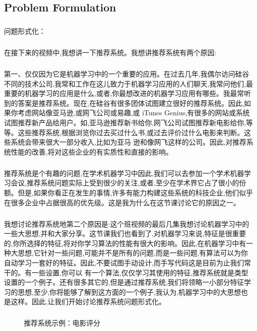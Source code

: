 \documentclass{article}
\begin{document}
\begin{CJK}{UTF8}{gbsn}
\subsection{Problem Formulation}
\subparagraph{}
问题形式化：
\subparagraph{}
在接下来的视频中,我想讲一下推荐系统。我想讲推荐系统有两个原因:
\subparagraph{}
第一、仅仅因为它是机器学习中的一个重要的应用。在过去几年,我偶尔访问硅谷不同的技术公司,我常和工作在这儿致力于机器学习应用的人们聊天,我常问他们,最重要的机器学习的应用是什么,或者,你最想改进的机器学习应用有哪些。我最常听到的答案是推荐系统。现在,在硅谷有很多团体试图建立很好的推荐系统。因此,如果你考虑网站像亚马逊,或网飞公司或易趣,或 iTunes Genius,有很多的网站或系统试图推荐新产品给用户。如,亚马逊推荐新书给你,网飞公司试图推荐新电影给你,等等。这些推荐系统,根据浏览你过去买过什么书,或过去评价过什么电影来判断。这些系统会带来很大一部分收入,比如为亚马
逊和像网飞这样的公司。因此,对推荐系统性能的改善,将对这些企业的有实质性和直接的影响。
\subparagraph{}
推荐系统是个有趣的问题,在学术机器学习中因此,我们可以去参加一个学术机器学习会议,推荐系统问题实际上受到很少的关注,或者,至少在学术界它占了很小的份额。但是,如果你看正在发生的事情,许多有能力构建这些系统的科技企业,他们似乎在很多企业中占据很高的优先级。这是我为什么在这节课讨论它的原因之一。
\subparagraph{}
我想讨论推荐系统地第二个原因是:这个班视频的最后几集我想讨论机器学习中的一些大思想,并和大家分享。这节课我们也看到了,对机器学习来说,特征是很重要的,你所选择的特征,将对你学习算法的性能有很大的影响。因此,在机器学习中有一种大思想,它针对一些问题,可能并不是所有的问题,而是一些问题,有算法可以为你自动学习一套好的特征。因此,不要试图手动设计,而手写代码这是目前为止我们常干的。有一些设置,你可以
有一个算法,仅仅学习其使用的特征,推荐系统就是类型设置的一个例子。还有很多其它的,但是通过推荐系统,我们将领略一小部分特征学习的思想,至少,你将能够了解到这方面的一个例子,我认为,机器学习中的大思想也是这样。因此,让我们开始讨论推荐系统问题形式化。
\subparagraph{}
\begin{figure}[H]
\label{fig:989}
\caption{推荐系统示例：电影评分}
\end{figure}
\begin{figure}[H]
\label{fig:990}
\end{figure}

\end{CJK}
\end{document}
